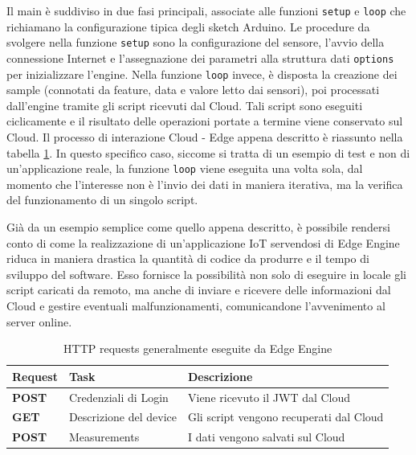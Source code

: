 Il main è suddiviso in due fasi principali, associate alle funzioni \texttt{setup} e \texttt{loop} che richiamano la configurazione tipica degli sketch Arduino. Le procedure da svolgere nella funzione \texttt{setup} sono la configurazione del sensore, l'avvio della connessione Internet e l'assegnazione dei parametri alla struttura dati \texttt{options} per inizializzare l'engine. Nella funzione \texttt{loop} invece, è disposta la creazione dei sample (connotati da feature, data e valore letto dai sensori), poi processati dall'engine tramite gli script ricevuti dal Cloud. Tali script sono eseguiti ciclicamente e il risultato delle operazioni portate a termine viene conservato sul Cloud. Il processo di interazione Cloud - Edge appena descritto è riassunto nella tabella \ref{loop}. In questo specifico caso, siccome si tratta di un esempio di test e non di un'applicazione reale, la funzione \texttt{loop} viene eseguita una volta sola, dal momento che l'interesse non è l'invio dei dati in maniera iterativa, ma la verifica del funzionamento di un singolo script.

Già da un esempio semplice come quello appena descritto, è possibile rendersi conto di come la realizzazione di un'applicazione IoT servendosi di Edge Engine riduca in maniera drastica la quantità di codice da produrre e il tempo di sviluppo del software. Esso fornisce la possibilità non solo di eseguire in locale gli script caricati da remoto, ma anche di inviare e ricevere delle informazioni dal Cloud e gestire eventuali malfunzionamenti, comunicandone l'avvenimento al server online.

\begin{table}[H]
	\centering
	\begin{tabular}{|l|l|l|}
		\hline
		\textbf{Request} & \textbf{Task} & \textbf{Descrizione}\\
		\hline
		\textbf{POST} & Credenziali di Login & Viene ricevuto il JWT dal Cloud\\
		\hline
		\textbf{GET} & Descrizione del device & Gli script vengono recuperati dal Cloud\\
		\hline
		\textbf{POST} & Measurements & I dati vengono salvati sul Cloud\\	
		\hline
	\end{tabular}
	\caption{HTTP requests generalmente eseguite da Edge Engine}
	\label{loop}
\end{table}

